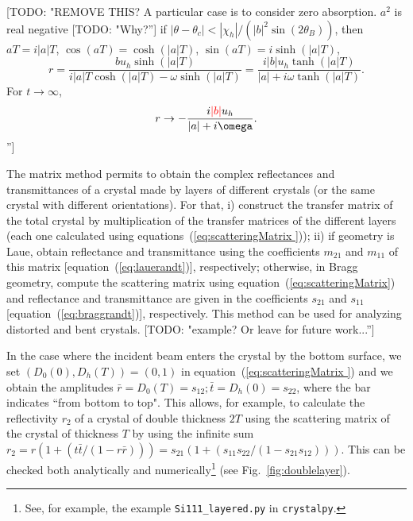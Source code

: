 \documentclass[preprint]{iucr}              %
\newcommand{\todo}[1]{{\color{red}[TODO: "#1'']}}
\newcommand{\inblue}[1]{{\color{blue}#1}}
\newcommand{\inred}[1]{{\color{red}#1}}
\begin{document}
\todo{REMOVE THIS? A particular case is to consider zero absorption. 
$a^2$ is real negative \todo{Why?} if $|\theta-\theta_c|<|\chi_h|/(|b|^2 \sin(2 \theta_B))$, then $aT=i |a| T$, $\cos(a T)=\cosh(|a|T)$, $\sin(a T)=i \sinh(|a|T)$, 
\begin{equation}
    r = \frac{b u_h \sinh(|a|T)}{i |a|T \cosh(|a|T)- \omega
    \sinh(|a|T)}=
\frac{i |b| u_h \tanh(|a|T)}{|a|+ i \omega \tanh(|a|T)}.
\end{equation}
For $t \rightarrow \infty$, 
\begin{equation}
    r \rightarrow - \frac{i \inred{|b|} u_h}{|a|+ i \omega} .
\end{equation}
}

\inblue{
The matrix method permits to obtain the complex reflectances and transmittances of a crystal made by layers of different crystals (or the same crystal with different orientations). For that, i) construct the transfer matrix of the total crystal by multiplication of the transfer matrices of the different layers (each one calculated using equations~(\ref{eq:scatteringMatrix })); ii) if geometry is Laue, obtain reflectance and transmittance using the coefficients $m_{21}$ and $m_{11}$ of this matrix [equation~(\ref{eq:lauerandt})], respectively; otherwise, in Bragg geometry, compute the scattering matrix using equation~(\ref{eq:scatteringMatrix}) and reflectance and transmittance are given in the coefficients $s_{21}$ and $s_{11}$ [equation~(\ref{eq:braggrandt})], respectively.  This method can be used for analyzing distorted and bent crystals.
}\todo{example? Or leave for future work...}

\inred{In the case where the incident beam enters the crystal by the bottom surface, we set $(D_0(0),D_h(T))=(0,1)$ in equation~(\ref{eq:scatteringMatrix }) and  we obtain the amplitudes $\bar{r}=D_0(T)=s_{12}; \bar{t}=D_h(0)=s_{22}$, where the bar indicates ``from bottom to top". This allows, for example, to calculate the reflectivity $r_{2}$ of a crystal of double thickness $2 T$ using the scattering matrix of the crystal of thickness $T$
by using the infinite sum $r_2=r(1 + (t \bar{t} / (1-r \bar{r})))=s_{21}(1 + (s_{11} s_{22} / (1-s_{21} s_{12})))$. This can be checked both analytically and numerically\footnote{See, for example, the example {\tt Si111\_layered.py} in {\tt crystalpy}.} (see Fig.~\ref{fig:doublelayer}).
}
\end{document}
